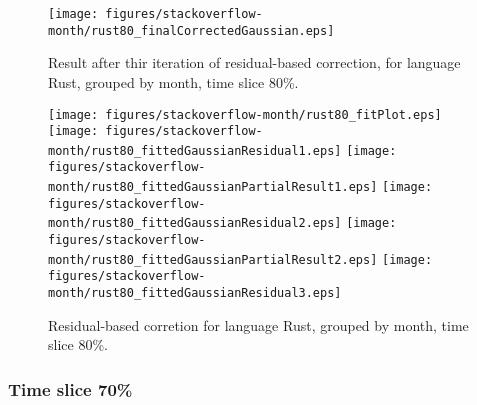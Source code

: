 \begin{figure}[]
\centering
{\texttt{[image: figures/stackoverflow-month/rust80\_finalCorrectedGaussian.eps]}}
\caption{Result after thir iteration of residual-based correction, for language Rust, grouped by month, time slice 80\%.}
\end{figure}


\begin{figure}[hb]
\centering
{}
{\texttt{[image: figures/stackoverflow-month/rust80\_fitPlot.eps]}}
{\texttt{[image: figures/stackoverflow-month/rust80\_fittedGaussianResidual1.eps]}}
{\texttt{[image: figures/stackoverflow-month/rust80\_fittedGaussianPartialResult1.eps]}}
{\texttt{[image: figures/stackoverflow-month/rust80\_fittedGaussianResidual2.eps]}}
{\texttt{[image: figures/stackoverflow-month/rust80\_fittedGaussianPartialResult2.eps]}}
{\texttt{[image: figures/stackoverflow-month/rust80\_fittedGaussianResidual3.eps]}}
\caption{Residual-based corretion for language Rust, grouped by month, time slice 80\%.}
\end{figure}


\clearpage 
\newpage 


\FloatBarrier

\subsubsection{Time slice 70\%}

